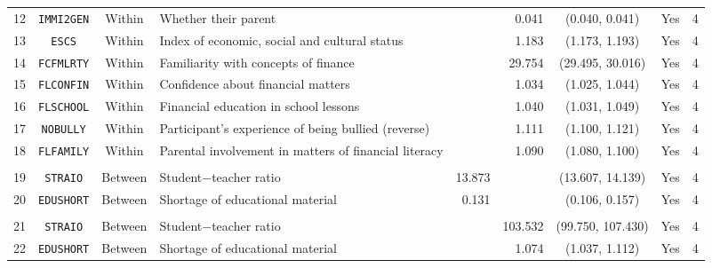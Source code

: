 {\begin{tabular}{ccclrrccc}
      12    & \texttt{IMMI2GEN} & Within & Whether their parent &       & 0.041 & (0.040, 0.041) & Yes   & 4 \\
      13    & \texttt{ESCS}  & Within & Index of economic, social and cultural status &       & 1.183 & (1.173, 1.193) & Yes   & 4 \\
      14    & \texttt{FCFMLRTY} & Within & Familiarity with concepts of finance &       & 29.754 & (29.495, 30.016) & Yes   & 4 \\
      15    & \texttt{FLCONFIN} & Within & Confidence about financial matters &       & 1.034 & (1.025, 1.044) & Yes   & 4 \\
      16    & \texttt{FLSCHOOL} & Within & Financial education in school lessons &       & 1.040 & (1.031, 1.049) & Yes   & 4 \\
      17    & \texttt{NOBULLY} & Within & Participant's experience of being bullied (reverse) &       & 1.111 & (1.100, 1.121) & Yes   & 4 \\
      18    & \texttt{FLFAMILY} & Within & Parental involvement in matters of financial literacy &       & 1.090 & (1.080, 1.100) & Yes   & 4 \\
            &       &       &       &       &       &       &       &  \\
      19    & \texttt{STRAIO} & Between & Student$-$teacher ratio & 13.873 &       & (13.607, 14.139) & Yes   & 4 \\
      20    & \texttt{EDUSHORT} & Between & Shortage of educational material & 0.131 &       & (0.106, 0.157) & Yes   & 4 \\
            &       &       &       &       &       &       &       &  \\
      21    & \texttt{STRAIO} & Between & Student$-$teacher ratio &       & 103.532 & (99.750, 107.430) & Yes   & 4 \\
      22    & \texttt{EDUSHORT} & Between & Shortage of educational material &       & 1.074 & (1.037, 1.112) & Yes   & 4 \\
\bottomrule
      \end{tabular}
}